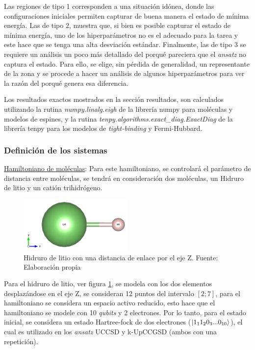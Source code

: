 Las regiones de tipo 1 corresponden a una situación idónea, donde las configuraciones iniciales permiten capturar de buena manera el estado de mínima energía. Las de tipo 2, muestra que, si bien es posible capturar el estado de mínima energía, uno de los hiperparámetros no es el adecuado para la tarea y este hace que se tenga una alta desviación estándar. Finalmente, las de tipo 3 se requiere un análisis un poco más detallado del porqué pareciera que el \textit{ansatz} no captura el estado. Para ello, se elige, sin pérdida de generalidad, un representante de la zona y se procede a hacer un análisis de algunos hiperparámetros para ver la razón del porqué genera esa diferencia. 


Los resultados exactos mostrados en la sección resultados, son calculados utilizando la rutina \textit{numpy.linalg.eigh} de la librería numpy para moléculas y modelos de espines, y la rutina  \textit{tenpy.algorithms.exact\_diag.ExactDiag} de la librería tenpy para los modelos de \textit{tight-binding} y Fermi-Hubbard.


\subsubsection{Definición de los sistemas}
\underline{Hamiltoniano de moléculas}: 
Para este hamiltoniano, se controlará el parámetro de distancia entre moléculas, se tendrá en consideración dos moléculas, un Hidruro de litio y un catión trihidrógeno. 


\begin{figure}[H]
\centering
\includegraphics[width=0.5\textwidth]{figures/S4/moleculas/lih.png}
\caption{\label{fig:li} Hidruro de litio con una distancia de enlace por el eje Z. Fuente: Elaboración propia} 
\end{figure}

Para el hidruro de litio, ver figura \ref{fig:li}, se modela con los dos elementos desplazándose en el eje Z, se consideran 12 puntos del intervalo $[2;7]$, para el hamiltoniano se considera un espacio activo reducido, esto hace que el hamiltoniano se modele con 10 \textit{qubits} y 2 electrones. Por lo tanto, para el estado inicial, se considera un estado Hartree-fock de dos electrones ($\ket{1_11_20_3...0_{10}}$), el cual es utilizado en los \textit{ansatz} UCCSD y k-UpCCGSD (ambos con una repetición).

